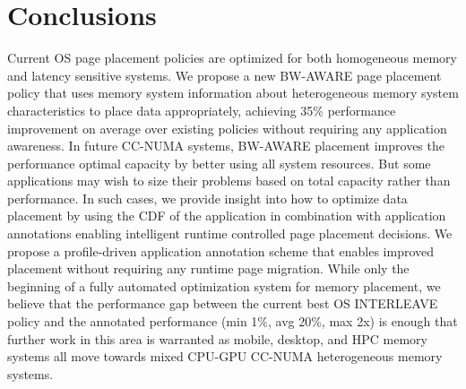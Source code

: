 \section{Conclusions}
\label{conclusions}

Current OS page placement policies are optimized for both homogeneous memory and
latency sensitive systems.  We propose a new BW-AWARE page placement policy that
uses memory system information about heterogeneous memory system characteristics to place data
appropriately, achieving 35\% performance improvement on average over existing
policies without requiring any application awareness.  In future CC-NUMA
systems,
BW-AWARE placement improves the performance optimal capacity by better using
all system resources. But some applications may wish to size their problems
based on total capacity rather than performance. In such cases, we provide insight into
how to optimize data placement by using the CDF of the application in
combination with application annotations enabling intelligent runtime
controlled page placement decisions.  We propose a profile-driven application
annotation scheme that enables improved placement without requiring any
runtime page migration. While only the beginning of a fully automated
optimization system for memory placement, we believe that the performance gap between the current
best OS INTERLEAVE policy and the annotated performance (min 1\%, avg 20\%, max
2x) is enough that further work in this area is warranted as mobile, desktop,
and HPC memory systems all move towards mixed CPU-GPU CC-NUMA heterogeneous memory systems.
